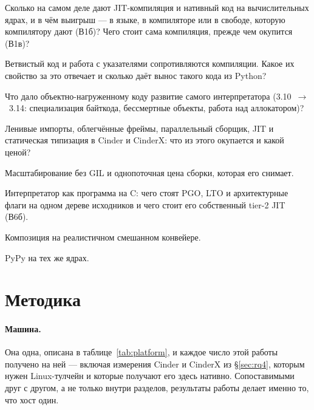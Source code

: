 \documentclass[10pt,a4paper]{article}
\begin{document}
\begin{description}[leftmargin=2.6em,itemsep=1pt,font=\normalfont\bfseries]
  \item[В1] Сколько на самом деле дают JIT-компиляция и нативный код на вычислительных ядрах, и
        в чём выигрыш --- в языке, в компиляторе или в свободе, которую компилятору дают (В1б)?
        Чего стоит сама компиляция, прежде чем окупится (В1в)?
  \item[В2] Ветвистый код и работа с указателями сопротивляются компиляции. Какое их свойство
        за это отвечает и сколько даёт вынос такого кода из Python?
  \item[В3] Что дало объектно-нагруженному коду развитие самого интерпретатора
        (3.10~$\to$~3.14: специализация байткода, бессмертные объекты, работа над аллокатором)?
  \item[В4] Ленивые импорты, облегчённые фреймы, параллельный сборщик, JIT и статическая
        типизация в Cinder и CinderX: что из этого окупается и какой ценой?
  \item[В5] Масштабирование без GIL и однопоточная цена сборки, которая его снимает.
  \item[В6] Интерпретатор как программа на C: чего стоят PGO, LTO и архитектурные флаги на одном
        дереве исходников и чего стоит его собственный tier-2 JIT (В6б).
  \item[В7] Композиция на реалистичном смешанном конвейере.
  \item[В8] PyPy на тех же ядрах.
  \end{description}

\section{Методика}
\label{sec:method}

\paragraph{Машина.}
Она одна, описана в таблице~\ref{tab:platform}, и каждое число этой работы получено на ней ---
включая измерения Cinder и CinderX из \S\ref{sec:rq4}, которым нужен Linux-тулчейн и которые
получают его здесь нативно. Сопоставимыми друг с другом, а не только внутри разделов, результаты
работы делает именно то, что хост один.
\end{document}
